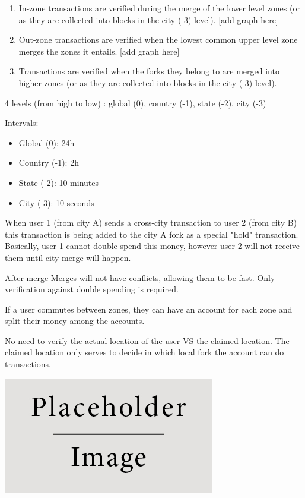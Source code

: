 \documentclass[portrait,a0paper,fontscale=0.305]{baposter} %
\begin{document}
\begin{poster}
{\begin{multicols}{2}
\begin{enumerate}
    \item In-zone transactions are verified during the merge of the lower level zones (or as they are collected into blocks in the city (-3) level). [add graph here]

    \item Out-zone transactions are verified when the lowest common upper level zone merges the zones it entails. [add graph here]

    \item Transactions are verified when the forks they belong to are merged into higher zones (or as they are collected into blocks in the city (-3) level).

\end{enumerate}

4 levels (from high to low) : global (0), country (-1), state (-2), city (-3)

Intervals:
\begin{itemize}
    \item Global (0): 24h
    \item Country (-1): 2h
    \item State (-2): 10 minutes
    \item City (-3): 10 seconds
\end{itemize}

When user 1 (from city A)  sends a cross-city transaction to user 2 (from city B) this transaction is being added to the city A fork as a special "hold" transaction. Basically, user 1 cannot double-spend this money, however user 2 will not receive them until city-merge will happen.

After merge 
Merges will not have conflicts, allowing them to be fast.  Only verification against double spending is required.

If a user commutes between zones, they can have an account for each zone and split their money among the accounts.

No need to verify the actual location of the user VS the claimed location.  The claimed location only serves to decide in which local fork the account can do transactions.

\begin{center}
\includegraphics[width=0.8\linewidth]{placeholder}
\end{center}


\end{multicols}}
\end{poster}
\end{document}
